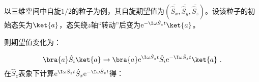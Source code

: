 
\begin{issues}
\issueMissDepend
\issueTODO
\end{issues}



以三维空间中自旋$1/2$的粒子为例，其自旋期望值为$(\overline{\hat S_x},\overline{\hat S_y},\overline{\hat S_z})$。设该粒子的初始态矢为$\ket{a}$，态矢绕$z$轴“转动”后变为$\mathrm e^{- \I\omega \hat S_zt}\ket{a}$。

则期望值变化为：

\begin{equation}
\bra{a}\hat S_i\ket{a}\rightarrow \bra{a}\mathrm e^{ \I\omega \hat S_zt}\hat S_i\mathrm e^{- \I\omega \hat S_zt}\ket{a}~.
\end{equation}
在$\hat S_z$表象下计算$\mathrm e^{ \I\omega \hat S_zt}\hat S_x\mathrm e^{- \I\omega \hat S_zt}$得：


